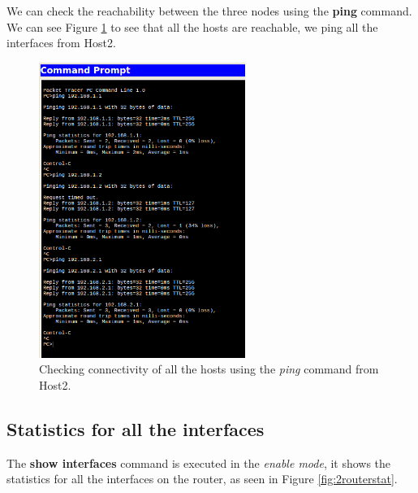 \documentclass{article}
\begin{document}
We can check the reachability between the three nodes using the \textbf{ping} command. We can see Figure \ref{fig:pinghosts} to see that all the hosts are reachable, we ping all the interfaces from Host2. 

\begin{figure}[h]
    \centering
    \includegraphics[width=0.6\textwidth]{2pinghosts}
    \caption{Checking connectivity of all the hosts using the \textit{ping} command from Host2.}
    \label{fig:pinghosts}
\end{figure}

\newpage
\subsection{Statistics for all the interfaces}

The \textbf{show interfaces} command is executed in the \textit{enable mode}, it shows the statistics for all the interfaces on the router, as seen in Figure \ref{fig:2routerstat}. 
\end{document}
